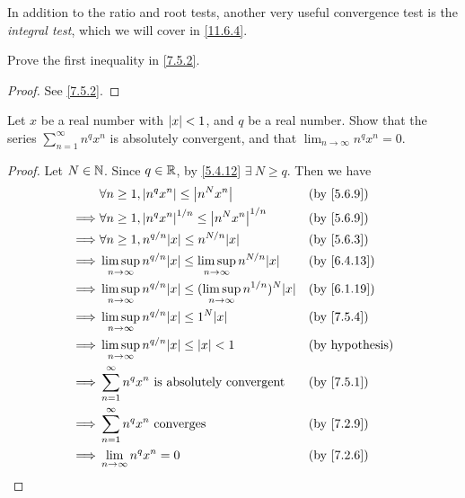 \begin{rmk}\label{7.5.5}
  In addition to the ratio and root tests, another very useful convergence test is the \emph{integral test}, which we will cover in \cref{11.6.4}.
\end{rmk}

\exercisesection

\begin{ex}\label{ex:7.5.1}
  Prove the first inequality in \cref{7.5.2}.
\end{ex}

\begin{proof}
  See \cref{7.5.2}.
\end{proof}

\begin{ex}\label{ex:7.5.2}
  Let \(x\) be a real number with \(\left\lvert x\right\rvert < 1\), and \(q\) be a real number.
  Show that the series \(\sum_{n = 1}^\infty n^q x^n\) is absolutely convergent, and that \(\lim_{n \to \infty} n^q x^n = 0\).
\end{ex}

\begin{proof}
  Let \(N \in \mathbb{N}\).
  Since \(q \in \mathbb{R}\), by \cref{5.4.12} \(\exists\ N \geq q\).
  Then we have
  \begin{align*}
             & \forall n \geq 1, \abs{n^q x^n} \leq \abs{n^N x^n}                                         &  & \text{(by \cref{5.6.9})}  \\
    \implies & \forall n \geq 1, \abs{n^q x^n}^{1 / n} \leq \abs{n^N x^n}^{1 / n}                         &  & \text{(by \cref{5.6.9})}  \\
    \implies & \forall n \geq 1, n^{q / n} \abs{x} \leq n^{N / n} \abs{x}                                 &  & \text{(by \cref{5.6.3})}  \\
    \implies & \limsup_{n \to \infty} n^{q / n} \abs{x} \leq \limsup_{n \to \infty} n^{N / n} \abs{x}     &  & \text{(by \cref{6.4.13})} \\
    \implies & \limsup_{n \to \infty} n^{q / n} \abs{x} \leq (\limsup_{n \to \infty} n^{1 / n})^N \abs{x} &  & \text{(by \cref{6.1.19})} \\
    \implies & \limsup_{n \to \infty} n^{q / n} \abs{x} \leq 1^N \abs{x}                                  &  & \text{(by \cref{7.5.4})}  \\
    \implies & \limsup_{n \to \infty} n^{q / n} \abs{x} \leq \abs{x} < 1                                  &  & \text{(by hypothesis)}    \\
    \implies & \sum_{n = 1}^\infty n^q x^n \text{ is absolutely convergent}                               &  & \text{(by \cref{7.5.1})}  \\
    \implies & \sum_{n = 1}^\infty n^q x^n \text{ converges}                                              &  & \text{(by \cref{7.2.9})}  \\
    \implies & \lim_{n \to \infty} n^q x^n = 0                                                            &  & \text{(by \cref{7.2.6})}
  \end{align*}
\end{proof}

